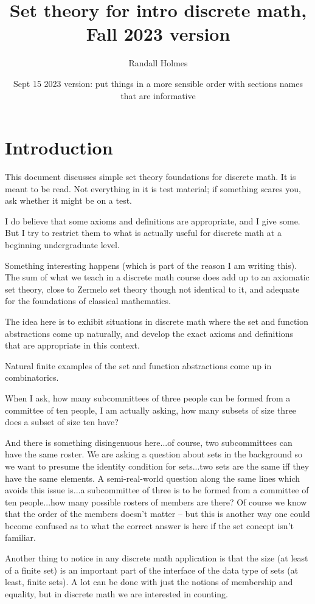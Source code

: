 \documentclass[12pt]{article}
\title{Set theory for intro discrete math, Fall 2023 version}
\author{Randall Holmes}
\date{Sept 15 2023 version:  put things in a more sensible order with sections names that are informative}
\begin{document}
\maketitle

\section{Introduction}

This document discusses simple set theory foundations for discrete math.  It is meant to be read.  Not everything in it is test material;  if something scares you, ask whether it might be on a test.

I do believe that some axioms and definitions are appropriate, and I give some.  But I try to restrict them to what is actually useful for discrete math at a beginning undergraduate level.

Something interesting happens (which is part of the reason I am writing this).  The sum of what we teach in a discrete math course does add up to an axiomatic set theory, close to Zermelo set theory though not identical to it, and adequate for the foundations of classical mathematics.

The idea here is to exhibit situations in discrete math where the set and function abstractions come up naturally, and develop the exact axioms and definitions that are appropriate in this context.

Natural finite examples of the set and function abstractions come up in combinatorics.

When I ask, how many subcommittees of three people can be formed from a committee of ten people, I am actually asking, how many subsets of size three does a subset of size ten have?

And there is something disingenuous here...of course, two subcommittees can have the same roster.  We are asking a question about sets in the background so we want to presume the identity condition for sets...two sets are the same iff they have the same elements.   A semi-real-world question along the same lines which avoids this issue is...a subcommittee of three is to be formed from a committee of ten people...how many possible rosters of members are there?  Of course we know that the order of the members doesn't matter -- but this is another way one could become confused as to what the correct answer is here if the set concept isn't familiar.

Another thing to notice in any discrete math application is that the size (at least of a finite set) is an important part of the interface of the data type of sets (at least, finite sets).  A lot can be done with just the notions of membership and equality, but in discrete math we are interested in counting.
\newpage
\end{document}
